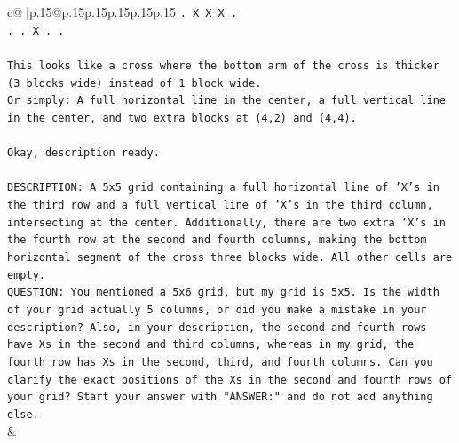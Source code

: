 \documentclass{article}
\begin{document}
{\begin{supertabular}{c@{$\;$}|p{.15\linewidth}@{}p{.15\linewidth}p{.15\linewidth}p{.15\linewidth}p{.15\linewidth}p{.15\linewidth}}
{{{\texttt{. X X X .} \\
\texttt{. . X . .} \\
\\ 
\texttt{This looks like a cross where the bottom arm of the cross is thicker (3 blocks wide) instead of 1 block wide.} \\
\texttt{Or simply: A full horizontal line in the center, a full vertical line in the center, and two extra blocks at (4,2) and (4,4).} \\
\\ 
\texttt{Okay, description ready.} \\
\\ 
\texttt{DESCRIPTION: A 5x5 grid containing a full horizontal line of 'X's in the third row and a full vertical line of 'X's in the third column, intersecting at the center. Additionally, there are two extra 'X's in the fourth row at the second and fourth columns, making the bottom horizontal segment of the cross three blocks wide. All other cells are empty.} \\
\texttt{QUESTION: You mentioned a 5x6 grid, but my grid is 5x5. Is the width of your grid actually 5 columns, or did you make a mistake in your description? Also, in your description, the second and fourth rows have Xs in the second and third columns, whereas in my grid, the fourth row has Xs in the second, third, and fourth columns. Can you clarify the exact positions of the Xs in the second and fourth rows of your grid? Start your answer with "ANSWER:" and do not add anything else.} \\
            }
        }
    }
    & \\ \\


\end{supertabular}}
\end{document}
